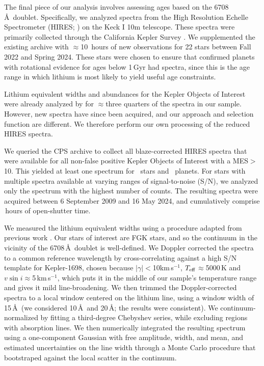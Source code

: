 \documentclass[11pt,twocolumn,tighten]{aastex63}
\newcommand{\kms}{{km\,s$^{-1}$}}
\begin{document}
The final piece of our analysis involves assessing ages based on the
 6708\,\AA\ doublet.  Specifically, we analyzed spectra
from the High Resolution Echelle Spectrometer (HIRES;
\citealt{vogt_hires_1994}) on the Keck I 10m telescope.  These spectra
were primarily collected through the California Kepler Survey
\citep{2017AJ....154..107P,2017AJ....154..108J,2017AJ....154..109F}.
We supplemented the existing archive with $\approx$10~hours of new
observations for 22 stars between Fall 2022 and Spring 2024.  These
stars were chosen to ensure that confirmed planets with rotational
evidence for ages below 1\,Gyr had spectra, since this is the age
range in which lithium is most likely to yield useful age constraints.

Lithium equivalent widths and abundances for the Kepler Objects of
Interest were already analyzed by \citet{2018ApJ...855..115B} for
$\approx$three quarters of the spectra in our sample.  However, new
spectra have since been acquired, and our approach and selection
function are different.  We therefore perform our own processing of
the reduced HIRES spectra.

We queried the CPS archive to collect all blaze-corrected HIRES
spectra that were available for all non-false positive Kepler Objects
of Interest with a MES$>$10.  This yielded at least one spectrum for
\nlithiumstars\ stars and \nlithiumplanets\ planets.  For stars with
multiple spectra available at varying ranges of signal-to-noise (S/N),
we analyzed only the spectrum with the highest number of counts.  The
resulting spectra were acquired between 6 September 2009 and 16 May
2024, and cumulatively comprise \nhireshours\,hours of open-shutter
time.

We measured the lithium equivalent widths using a procedure adapted
from previous work \citep{Bouma_2021}.  Our stars of interest are FGK
stars, and so the continuum in the vicinity of the 
6708\,\AA\ doublet is well-defined.  We Doppler corrected the spectra
to a common reference wavelength by cross-correlating against a high
S/N template for Kepler-1698, chosen because $|\gamma|$$<$10\kms,
$T_{\rm eff}$$\approx$5000\,K and $v\sin i$$\approx$5\,\kms, which
puts it in the middle of our sample's temperature range and gives it
mild line-broadening.  We then trimmed the Doppler-corrected spectra
to a local window centered on the lithium line, using a window width
of 15\,\AA\ (we considered 10\,\AA\ and 20\,\AA; the results were
consistent).  We continuum-normalized by fitting a third-degree
Chebyshev series, while excluding regions with absorption lines.  We
then numerically integrated the resulting spectrum using a
one-component Gaussian with free amplitude, width, and mean, and
estimated uncertainties on the line width through a Monte Carlo
procedure that bootstraped against the local scatter in the continuum.
\end{document}

